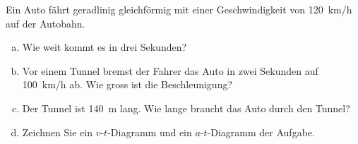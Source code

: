 
\begin{aufgabe}
	Ein Auto fährt geradlinig gleichförmig mit einer Geschwindigkeit von \SI{120}{km/h} auf der Autobahn.  
\begin{enumerate}[a)]
	\item Wie weit kommt es in drei Sekunden?
	\item Vor einem Tunnel bremst der Fahrer das Auto in zwei Sekunden auf \SI{100}{km/h} ab.
		Wie gross ist die Beschleunigung?
	\item Der Tunnel ist \SI{140}{m} lang. Wie lange braucht das Auto durch den Tunnel?
	\item Zeichnen Sie ein $v$-$t$-Diagramm und ein $a$-$t$-Diagramm der Aufgabe.
\end{enumerate}
\end{aufgabe}


